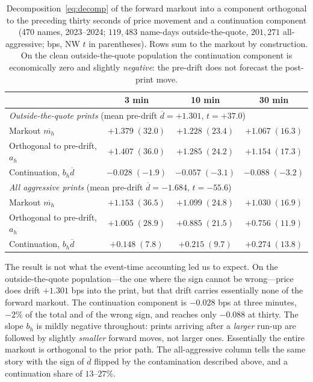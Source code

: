 \documentclass[11pt]{article}
\begin{document}
\begin{table}[htbp]
\centering
\begin{tabular}{lccc}
\toprule
& \textbf{3 min} & \textbf{10 min} & \textbf{30 min} \\
\midrule
\multicolumn{4}{l}{\emph{Outside-the-quote prints} (mean pre-drift $\overline{d} = +1.301$, $t=+37.0$)} \\
\quad Markout $\overline{m_h}$ & $+1.379\;(32.0)$ & $+1.228\;(23.4)$ & $+1.067\;(16.3)$ \\
\quad Orthogonal to pre-drift, $a_h$ & $+1.407\;(36.0)$ & $+1.285\;(24.2)$ & $+1.154\;(17.3)$ \\
\quad Continuation, $b_h\overline{d}$ & $-0.028\;(-1.9)$ & $-0.057\;(-3.1)$ & $-0.088\;(-3.2)$ \\
\midrule
\multicolumn{4}{l}{\emph{All aggressive prints} (mean pre-drift $\overline{d} = -1.684$, $t=-55.6$)} \\
\quad Markout $\overline{m_h}$ & $+1.153\;(36.5)$ & $+1.099\;(24.8)$ & $+1.030\;(16.9)$ \\
\quad Orthogonal to pre-drift, $a_h$ & $+1.005\;(28.9)$ & $+0.885\;(21.5)$ & $+0.756\;(11.9)$ \\
\quad Continuation, $b_h\overline{d}$ & $+0.148\;(7.8)$ & $+0.215\;(9.7)$ & $+0.274\;(13.8)$ \\
\bottomrule
\end{tabular}
\caption{Decomposition~\eqref{eq:decomp} of the forward markout into a component orthogonal
to the preceding thirty seconds of price movement and a continuation component (470 names,
2023--2024; $119{,}483$ name-days outside-the-quote, $201{,}271$ all-aggressive; bps, NW $t$
in parentheses). Rows sum to the markout by construction. On the clean outside-the-quote
population the continuation component is economically zero and slightly \emph{negative}: the
pre-drift does not forecast the post-print move.}
\label{tab:decomposition}
\end{table}

The result is not what the event-time accounting led us to expect. On the outside-the-quote
population---the one where the sign cannot be wrong---price does drift $+1.301$ bps into the
print, but that drift carries essentially none of the forward markout. The continuation
component is $-0.028$ bps at three minutes, $-2\%$ of the total and of the wrong sign, and
reaches only $-0.088$ at thirty. The slope $b_h$ is mildly negative throughout: prints
arriving after a \emph{larger} run-up are followed by slightly \emph{smaller} forward moves,
not larger ones. Essentially the entire markout is orthogonal to the prior path. The
all-aggressive column tells the same story with the sign of $\overline{d}$ flipped by the
contamination described above, and a continuation share of $13$--$27\%$.
\end{document}
